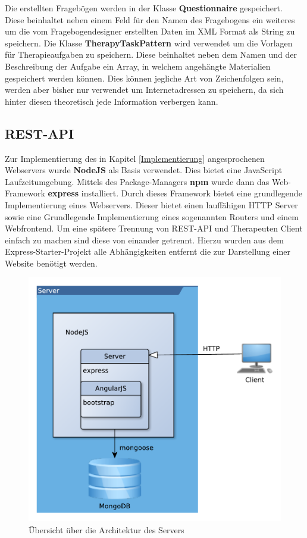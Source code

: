Die erstellten Fragebögen werden in der Klasse \textbf{Questionnaire} gespeichert. Diese beinhaltet neben einem Feld für den Namen des Fragebogens ein weiteres um die vom Fragebogendesigner  erstellten Daten im XML Format als String zu speichern.
Die Klasse \textbf{TherapyTaskPattern} wird verwendet um die Vorlagen für Therapieaufgaben zu speichern. Diese beinhaltet neben dem Namen und der Beschreibung der Aufgabe ein Array, in welchem angehängte Materialien gespeichert werden können. Dies können jegliche Art von Zeichenfolgen sein, werden aber bisher nur verwendet um Internetadressen zu speichern, da sich hinter diesen theoretisch jede Information verbergen kann.


\subsection{REST-API}
Zur Implementierung des in Kapitel \ref{Implementierung} angesprochenen Webservers wurde \textbf{NodeJS} \cite{NODE16} als Basis verwendet. Dies bietet eine JavaScript Laufzeitumgebung. Mittels des Package-Managers \textbf{npm} wurde dann das Web-Framework \textbf{express} installiert. Durch dieses Framework bietet eine grundlegende Implementierung eines Webservers. Dieser bietet einen lauffähigen HTTP Server sowie eine Grundlegende Implementierung eines sogenannten Routers und einem Webfrontend. Um eine spätere Trennung von REST-API und Therapeuten Client einfach zu machen sind diese von einander getrennt. Hierzu wurden aus dem Express-Starter-Projekt alle Abhängigkeiten entfernt die zur Darstellung einer Website benötigt werden. 

\begin{figure}[H]
	\centering
	\includegraphics[scale=0.7]{images/ServerArchitektur}
	\caption[Übersicht über die Architektur des Servers]{Übersicht über die Architektur des Servers}
	\label{ServerArchitektur}
\end{figure}

